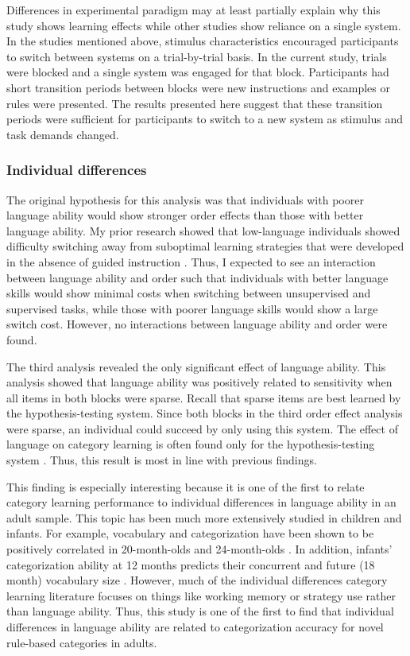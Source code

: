 \documentclass[../dissertation.tex]{subfiles}
\begin{document}
	Differences in experimental paradigm may at least partially explain why this study shows learning effects while other studies show reliance on a single system. In the studies mentioned above, stimulus characteristics encouraged participants to switch between systems on a trial-by-trial basis. In the current study, trials were blocked and a single system was engaged for that block. Participants had short transition periods between blocks were new instructions and examples or rules were presented. The results presented here suggest that these transition periods were sufficient for participants to switch to a new system as stimulus and task demands changed. 
	
\subsubsection{Individual differences}

	The original hypothesis for this analysis was that individuals with poorer language ability would show stronger order effects than those with better language ability. My prior research showed that low-language individuals showed difficulty switching away from suboptimal learning strategies that were developed in the absence of guided instruction \citep{Ryherd2019}. Thus, I expected to see an interaction between language ability and order such that individuals with better language skills would show minimal costs when switching between unsupervised and supervised tasks, while those with poorer language skills would show a large switch cost. However, no interactions between language ability and order were found. \par
	The third analysis revealed the only significant effect of language ability. This analysis showed that language ability was positively related to sensitivity when all items in both blocks were sparse. Recall that sparse items are best learned by the hypothesis-testing system. Since both blocks in the third order effect analysis were sparse, an individual could succeed by only using this system. The effect of language on category learning is often found only for the hypothesis-testing system \citep{Lupyan2009,Lupyan2013}. Thus, this result is most in line with previous findings. \par 
	This finding is especially interesting because it is one of the first to relate category learning performance to individual differences in language ability in an adult sample. This topic has been much more extensively studied in children and infants. For example, vocabulary and  categorization have been shown to be positively correlated in 20-month-olds \citep{Nazzi2001} and 24-month-olds \citep{Jaswal2007}. In addition, infants' categorization ability at 12 months predicts their concurrent and future (18 month) vocabulary size \citep{Ferguson2015}. However, much of the individual differences category learning literature focuses on things like working memory or strategy use rather than language ability. Thus, this study is one of the first to find that individual differences in language ability are related to categorization accuracy for novel rule-based categories in adults.
	
\end{document}
